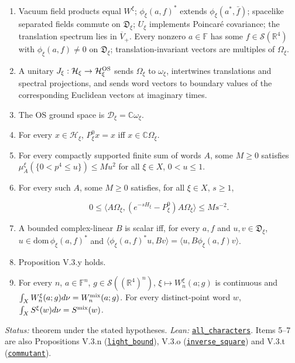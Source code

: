 \documentclass[
  letterpaper,
  11pt]{article}
\begin{document}
\begin{enumerate}
\def\labelenumi{\arabic{enumi}.}
\item
  Vacuum field products equal \(W^\xi\); \(\phi_\xi(a,f)^*\) extends
  \(\phi_\xi(a^*,\bar f)\); spacelike separated fields commute on
  \(\mathfrak D_\xi\); \(U_\xi\) implements Poincaré covariance; the
  translation spectrum lies in \(\overline V_+\). Every nonzero
  \(a\in\mathbb F\) has some \(f\in\mathcal S(\mathbb R^4)\) with
  \(\phi_\xi(a,f)\ne0\) on \(\mathfrak D_\xi\); translation-invariant
  vectors are multiples of \(\Omega_\xi\).
\item
  A unitary \(J_\xi:\mathcal H_\xi\to\mathcal H^{\rm OS}_\xi\) sends
  \(\Omega_\xi\) to \(\omega_\xi\), intertwines translations and
  spectral projections, and sends word vectors to boundary values of the
  corresponding Euclidean vectors at imaginary times.
\item
  The OS ground space is \(\mathcal D_\xi=\mathbb C\omega_\xi\).
\item
  For every \(x\in\mathcal H_\xi\), \(P^0_\xi x=x\) iff
  \(x\in\mathbb C\Omega_\xi\).
\item
  For every compactly supported finite sum of words \(A\), some
  \(M\ge0\) satisfies \(\mu_A^\xi(\{0<p^4\le u\})\le Mu^2\) for all
  \(\xi\in X\), \(0<u\le1\).
\item
  For every such \(A\), some \(M\ge0\) satisfies, for all \(\xi\in X\),
  \(s\ge1\),

  \[0\le\langle A\Omega_\xi,(e^{-sH_\xi}-P^0_\xi)A\Omega_\xi\rangle\le Ms^{-2}.\]
\item
  A bounded complex-linear \(B\) is scalar iff, for every \(a,f\) and
  \(u,v\in\mathfrak D_\xi\), \(u\in\mathrm{dom}\,\phi_\xi(a,f)^*\) and
  \(\langle\phi_\xi(a,f)^*u,Bv\rangle=\langle u,B\phi_\xi(a,f)v\rangle\).
\item
  Proposition V.3.y holds.
\item
  For every \(n\), \(a\in\mathbb F^n\),
  \(g\in\mathcal S((\mathbb R^4)^n)\), \(\xi\mapsto W_n^\xi(a;g)\) is
  continuous and \(\int_XW_n^\xi(a;g)d\nu=W_n^{\rm mix}(a;g)\). For
  every distinct-point word \(w\),
  \(\int_XS^\xi(w)d\nu=S^{\rm mix}(w)\).
\end{enumerate}

\emph{Status:} theorem under the stated hypotheses. \emph{Lean:}
\href{https://github.com/yang-mills-group/OpenAI-YM-20261028/blob/3456e5e75cf8d4cd558955a5c7638fba2d68f464/YM/EveryPhase/Extension.lean\#L75-L80}{\texttt{all\_characters}}.
Items 5--7 are also Propositions V.3.n
(\href{https://github.com/yang-mills-group/OpenAI-YM-20261028/blob/3456e5e75cf8d4cd558955a5c7638fba2d68f464/YM/EveryPhase/Light.lean\#L221-L232}{\texttt{light\_bound}}),
V.3.o
(\href{https://github.com/yang-mills-group/OpenAI-YM-20261028/blob/3456e5e75cf8d4cd558955a5c7638fba2d68f464/YM/EveryPhase/Decay.lean\#L173-L192}{\texttt{inverse\_square}})
and V.3.t
(\href{https://github.com/yang-mills-group/OpenAI-YM-20261028/blob/3456e5e75cf8d4cd558955a5c7638fba2d68f464/YM/EveryPhase/Irreducible.lean\#L118-L193}{\texttt{commutant}}).
\end{document}
